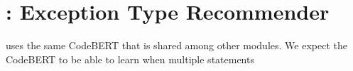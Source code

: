 \section{{\xtype}: Exception Type Recommender}
\label{sec:type}

{\xtype} uses the same CodeBERT that is shared  among other modules. We expect the CodeBERT to be able to learn when multiple statements


%
%
